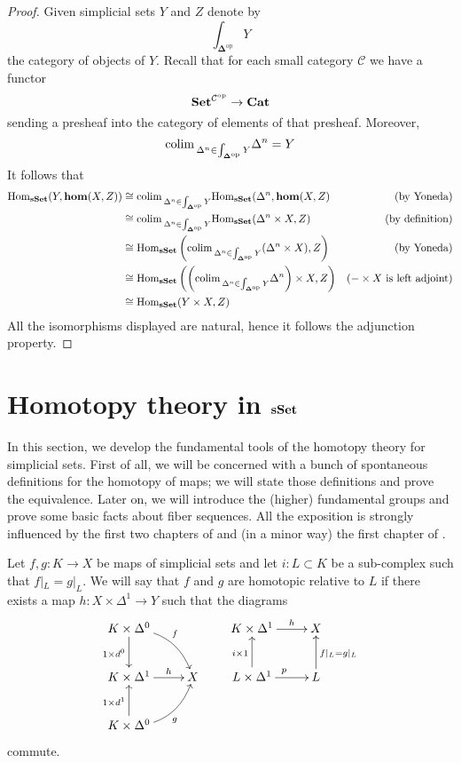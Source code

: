 \begin{proof}
Given simplicial sets $Y$ and $Z$ denote by
\[
\int_{\mathbf \Delta^{\mathrm{op}}} Y
\]
the category of objects of $Y$. Recall that for each small category $\mathcal C$ we have a functor
\[
\mathbf{Set}^{\mathcal C^{\mathrm{op}}} \to \mathbf{Cat}
\]
sending a presheaf into the category of elements of that presheaf. Moreover,
\[
\mathrm{colim} \,_{\Delta^n \in \int_{\mathbf \Delta^{\mathrm{op}}} Y} \Delta^n = Y
\]
It follows that
\begin{align*}
\mathrm{Hom}_{\mathbf{sSet}}(Y, \mathbf{hom}(X,Z)) & \cong \mathrm{colim} \,_{\Delta^n \in \int_{\mathbf \Delta^{\mathrm{op}}} Y} \mathrm{Hom}_{\mathbf{sSet}}(\Delta^n, \mathbf{hom}(X,Z) & \text{(by Yoneda)} \\
& \cong \mathrm{colim} \,_{\Delta^n \in \int_{\mathbf \Delta^{\mathrm{op}}} Y} \mathrm{Hom}_{\mathbf{sSet}} (\Delta^n \times X, Z) & \text{(by definition)} \\
& \cong \mathrm{Hom}_{\mathbf{sSet}} \left( \mathrm{colim} \,_{\Delta^n \in \int_{\mathbf \Delta^{\mathrm{op}}} Y} (\Delta^n \times X), Z \right) & \text{(by Yoneda)} \\
& \cong \mathrm{Hom}_{\mathbf{sSet}} \left( \left( \mathrm{colim} \,_{\Delta^n \in \int_{\mathbf \Delta^{\mathrm{op}}} Y} \Delta^n \right) \times X, Z \right) & \text{($- \times X$ is left adjoint)} \\
& \cong \mathrm{Hom}_{\mathbf{sSet}} (Y \times X, Z)
\end{align*}
All the isomorphisms displayed are natural, hence it follows the adjunction property.
\end{proof}


\section{Homotopy theory in $\mathbf{sSet}$}

In this section, we develop the fundamental tools of the homotopy theory for simplicial sets. First of all, we will be concerned with a bunch of spontaneous definitions for the homotopy of maps; we will state those definitions and prove the equivalence. Later on, we will introduce the (higher) fundamental groups and prove some basic facts about fiber sequences. All the exposition is strongly influenced by the first two chapters of \cite{may} and (in a minor way) the first chapter of \cite{gj}.

\begin{defin}
Let $f,g \colon K \to X$ be maps of simplicial sets and let $i \colon L \subset K$ be a sub-complex such that $f |_L = g|_L$. We will say that $f$ and $g$ are homotopic relative to $L$ if there exists a map $h \colon X \times \Delta^1 \to Y$ such that the diagrams
\[
\xymatrix{
K \times \Delta^0 \ar[d]_{1 \times d^0} \ar@/^1pc/[dr]^f \\ K \times \Delta^1 \ar[r]^-h & X \\ K \times \Delta^0 \ar[u]^{1 \times d^1} \ar@/_1pc/[ur]_g
} \qquad \xymatrix{K \times \Delta^1 \ar[r]^-h & X \\ L \times \Delta^1 \ar[u]^{i \times 1} \ar[r]^p & L \ar[u]_{f|_L = g|_L}
}
\]
commute.
\end{defin}



